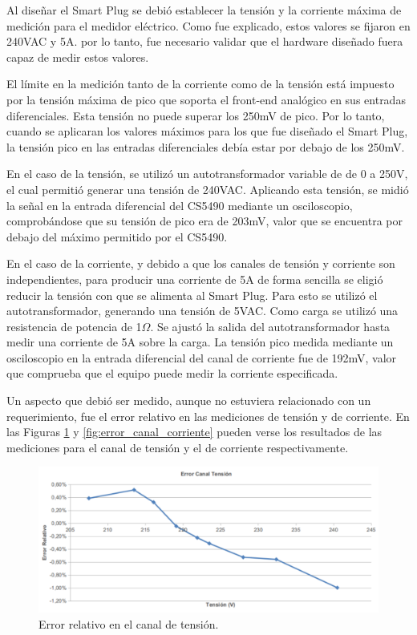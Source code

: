 Al diseñar el Smart Plug se debió establecer la tensión y la corriente máxima de medición para el medidor eléctrico. Como fue explicado, estos valores se fijaron en 240VAC y 5A. por lo tanto, fue necesario validar que el hardware diseñado fuera capaz de medir estos valores.

El límite en la medición tanto de la corriente como de la tensión está impuesto por la tensión máxima de pico que soporta el front-end analógico en sus entradas diferenciales. Esta tensión no puede superar los 250mV de pico. Por lo tanto, cuando se aplicaran los valores máximos para los que fue diseñado el Smart Plug, la tensión pico en las entradas diferenciales debía estar por debajo de los 250mV.

En el caso de la tensión, se utilizó un autotransformador variable de de 0 a 250V, el cual permitió generar una tensión de 240VAC. Aplicando esta tensión, se midió la señal en la entrada diferencial del CS5490 mediante un osciloscopio, comprobándose que su tensión de pico era de 203mV, valor que se encuentra por debajo del máximo permitido por el CS5490.

En el caso de la corriente, y debido a que los canales de tensión y corriente son independientes, para producir una corriente de 5A de forma sencilla se eligió reducir la tensión con que se alimenta al Smart Plug. Para esto se utilizó el autotransformador, generando una tensión de 5VAC. Como carga se utilizó una resistencia de potencia de 1$\Omega$. Se ajustó la salida del autotransformador hasta medir una corriente de 5A sobre la carga. La tensión pico medida mediante un osciloscopio en la entrada diferencial del canal de corriente fue de 192mV, valor que comprueba que el equipo puede medir la corriente especificada.

Un aspecto que debió ser medido, aunque no estuviera relacionado con un requerimiento, fue el error relativo en las mediciones de tensión y de corriente. En las Figuras \ref{fig:error_canal_tensión} y \ref{fig:error_canal_corriente} pueden verse los resultados de las mediciones para el canal de tensión y el de corriente respectivamente.

\begin{figure}[h]
	\centering
	\includegraphics[width=12cm]{./Figures/4_1_1_error_canal_tension.pdf}
	\caption{Error relativo en el canal de tensión.}
	\label{fig:error_canal_tensión}
\end{figure}

